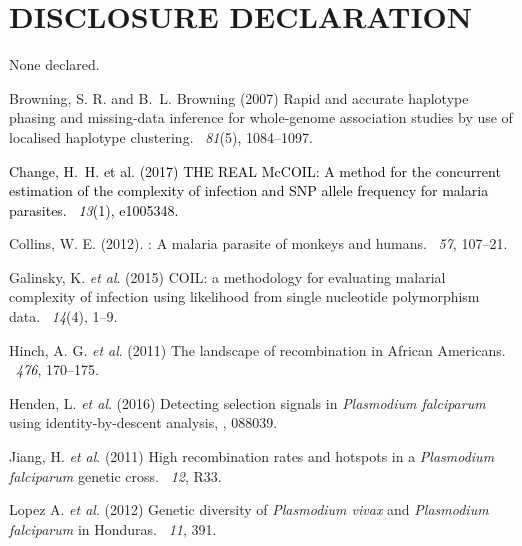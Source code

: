 \documentclass{article}
\begin{document}
\section{DISCLOSURE DECLARATION}
None declared.


\begin{thebibliography}{}

Browning, S. R. and B.~L. Browning (2007)
\newblock Rapid and accurate haplotype phasing and missing-data inference for
  whole-genome association studies by use of localised haplotype clustering.
~{\em 81\/}(5), 1084--1097.

\textcolor{black}{Change, H.~H. et al. (2017)
\newblock THE REAL McCOIL: A method for the concurrent estimation of the complexity of infection and SNP allele frequency for malaria parasites.
~{\em 13\/}(1), e1005348.}

Collins, W. E. (2012).
: A malaria parasite of monkeys and humans.
~{\em 57\/}, 107--21.

Galinsky, K. {\em et al}. (2015)
\newblock COIL: a methodology for evaluating malarial complexity of infection using likelihood from single nucleotide polymorphism data.
~{\em14\/}(4), 1--9.

Hinch, A. G. {\em et al}. (2011)
\newblock The landscape of recombination in African Americans.
~{\em 476}, 170--175.

Henden, L. {\em et al}. (2016)
\newblock Detecting selection signals in {\it Plasmodium falciparum} using identity-by-descent analysis,
, 088039.

Jiang, H. {\em et al}. (2011)
\newblock High recombination rates and hotspots in a {\it Plasmodium falciparum} genetic cross.
~{\em 12}, R33.

Lopez A. {\em et al}. (2012)
\newblock Genetic diversity of {\it Plasmodium vivax} and {\it Plasmodium falciparum} in Honduras.
~{\em 11}, 391.


\end{thebibliography}
\end{document}
